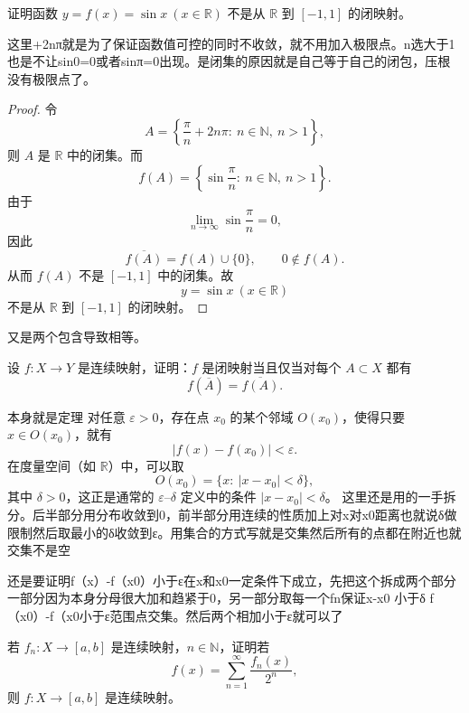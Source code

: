 \begin{homework}[13]
证明函数 $y = f(x) = \sin x \ (x \in \mathbb{R})$ 不是从 $\mathbb{R}$ 到 $[-1,1]$ 的闭映射。
\end{homework}
\begin{dxtips}
    这里+2nπ就是为了保证函数值可控的同时不收敛，就不用加入极限点。n选大于1也是不让sin0=0或者sinπ=0出现。是闭集的原因就是自己等于自己的闭包，压根没有极限点了。
\end{dxtips}
\begin{proof}
令
\[
A=\left\{\frac{\pi}{n}+2n\pi:\ n\in\mathbb{N},\ n>1\right\},
\]
则 $A$ 是 $\mathbb{R}$ 中的闭集。而
\[
f(A)=\left\{\sin\frac{\pi}{n}:\ n\in\mathbb{N},\ n>1\right\}.
\]
由于
\[
\lim_{n\to\infty}\sin\frac{\pi}{n}=0,
\]
因此
\[
\overline{f(A)}=f(A)\cup\{0\},
\qquad
0\notin f(A).
\]
从而 $f(A)$ 不是 $[-1,1]$ 中的闭集。故
\[
y=\sin x\ (x\in\mathbb{R})
\]
不是从 $\mathbb{R}$ 到 $[-1,1]$ 的闭映射。
\end{proof}
\begin{dxtips}
    又是两个包含导致相等。
\end{dxtips}
\begin{homework}[3.6]
设 $f : X \to Y$ 是连续映射，证明：$f$ 是闭映射当且仅当对每个 $A \subset X$ 都有
\[
f(\overline{A}) = \overline{f(A)}.
\]
\end{homework}
\begin{dxtips}
    本身就是定理
    对任意 $\varepsilon>0$，存在点 $x_0$ 的某个邻域 $O(x_0)$，使得只要
$x\in O(x_0)$，就有
\[
|f(x)-f(x_0)|<\varepsilon.
\]
在度量空间（如 $\mathbb{R}$）中，可以取
\[
O(x_0)=\{x:\ |x-x_0|<\delta\},
\]
其中 $\delta>0$，这正是通常的 $\varepsilon$--$\delta$ 定义中的条件 $|x-x_0|<\delta$。
这里还是用的一手拆分。后半部分用分布收敛到0，前半部分用连续的性质加上对x对x0距离也就说δ做限制然后取最小的δ收敛到ε。用集合的方式写就是交集然后所有的点都在附近也就交集不是空
\end{dxtips}
\begin{dxtips}
    还是要证明f（x）-f（x0）小于ε在x和x0一定条件下成立，先把这个拆成两个部分一部分因为本身分母很大加和趋紧于0，另一部分取每一个fn保证x-x0
小于δ f（x0）-f（x0小于ε范围点交集。然后两个相加小于ε就可以了
\end{dxtips}
\begin{homework}[3.3]
若 $f_n : X \to [a,b]$ 是连续映射，$n \in \mathbb{N}$，证明若
\[
f(x) = \sum_{n=1}^{\infty} \frac{f_n(x)}{2^n},
\]
则 $f : X \to [a,b]$ 是连续映射。
\end{homework}
